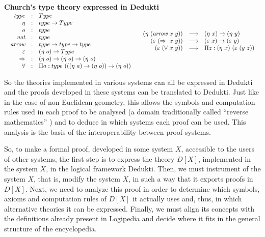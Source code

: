 \begin{shaded}
  \vspace{-0.5cm}
  \begin{center}
    {\bf\Large Church's type theory expressed in Dedukti}\\[3mm]
    $\begin{array}{cc}
      \begin{array}{rcl}
        type&:&Type\\
        \eta&:&type \rightarrow Type\\
        o&:&type\\
        \mbox{\it nat}&:&type\\
        \mbox{\it arrow}&:&type \rightarrow type \rightarrow type\\
        \varepsilon&:&(\eta~o) \rightarrow Type\\
        \Rightarrow&:&(\eta~o) \rightarrow (\eta~o) \rightarrow (\eta~o)\\
        \forall&:&\Pi a:type~(((\eta~a) \rightarrow (\eta~o)) \rightarrow (\eta~o))\\
      \end{array}
      &\begin{array}{rcl}
         (\eta~(\mbox{\it arrow}~x~y)) &\longrightarrow& (\eta~x) \rightarrow (\eta~y)\\
         (\varepsilon~(\Rightarrow~x~y)) &\longrightarrow& (\varepsilon~x) \rightarrow (\varepsilon~y)\\
         (\varepsilon~(\forall~x~y)) &\longrightarrow& \Pi z:(\eta~x)~(\varepsilon~(y~z))
       \end{array}\\
    \end{array}$
  \end{center}
  \vspace{-5mm}
\end{shaded}

So the theories implemented in various systems can all be expressed in
Dedukti and the proofs developed in these systems can be translated to
Dedukti. Just like in the case of non-Euclidean geometry, this allows
the symbols and computation rules used in each proof to be analysed
\cite{Thire18,Dowek17} (a domain traditionally called ``reverse
mathematics'' \cite{Friedman75,Simpson09}) and to deduce in which
systems each proof can be used.  This analysis is the basis of the
interoperability between proof systems.

So, to make a formal proof, developed in some system $X$, accessible
to the users of other systems, the first step is to express the theory
$D[X]$, implemented in the system $X$, in the logical framework
Dedukti.  Then, we must instrument of the system $X$, that is, modify the
system $X$, in such a way that it exports proofs in $D[X]$.  Next, we
need to analyze this proof in order to determine which symbols, axioms
and computation rules of $D[X]$ it actually uses and, thus, in which
alternative theories it can be expressed.  Finally, we must align its
concepts with the definitions already present in Logipedia and decide
where it fits in the general structure of the encyclopedia.

